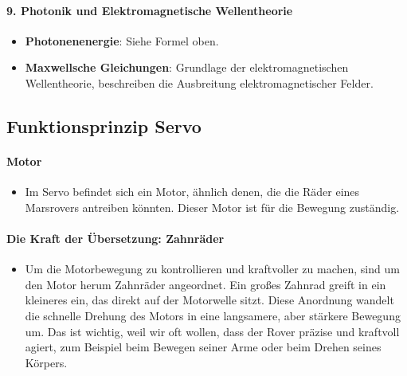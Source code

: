 \documentclass{vorlage-design-main}
\begin{document}
\hypertarget{photonik-und-elektromagnetische-wellentheorie}{%
\paragraph{9. Photonik und Elektromagnetische
Wellentheorie}\label{photonik-und-elektromagnetische-wellentheorie}}

\begin{itemize}

\item
  \textbf{Photonenenergie}: Siehe Formel oben.
\item
  \textbf{Maxwellsche Gleichungen}: Grundlage der elektromagnetischen
  Wellentheorie, beschreiben die Ausbreitung elektromagnetischer Felder.
\end{itemize}

\hypertarget{funktionsprinzip-servo}{%
\subsection{Funktionsprinzip Servo}\label{funktionsprinzip-servo}}

\hypertarget{motor}{%
\paragraph{Motor}\label{motor}}

\begin{itemize}

\item
  Im Servo befindet sich ein Motor, ähnlich denen, die die Räder eines
  Marsrovers antreiben könnten. Dieser Motor ist für die Bewegung
  zuständig.
\end{itemize}

\hypertarget{die-kraft-der-uxfcbersetzung-zahnruxe4der}{%
\paragraph{Die Kraft der Übersetzung:
Zahnräder}\label{die-kraft-der-uebersetzung-zahnraeder}}

\begin{itemize}

\item
  Um die Motorbewegung zu kontrollieren und kraftvoller zu machen, sind
  um den Motor herum Zahnräder angeordnet. Ein großes Zahnrad greift in
  ein kleineres ein, das direkt auf der Motorwelle sitzt. Diese
  Anordnung wandelt die schnelle Drehung des Motors in eine langsamere,
  aber stärkere Bewegung um. Das ist wichtig, weil wir oft wollen, dass
  der Rover präzise und kraftvoll agiert, zum Beispiel beim Bewegen
  seiner Arme oder beim Drehen seines Körpers.
\end{itemize}
\end{document}

